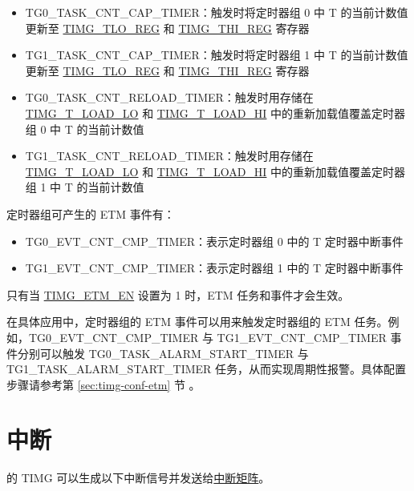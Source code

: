 \documentclass[main\_\_CN.tex]{subfiles}
\begin{document}
\begin{itemize}
\item TG0\_TASK\_CNT\_CAP\_TIMER：触发时将定时器组 0 中 T 的当前计数值更新至 \hyperref[regdesc:TIMGTXLOREG]{TIMG\_TLO\_REG} 和 \hyperref[regdesc:TIMGTXHIREG]{TIMG\_THI\_REG} 寄存器
\item TG1\_TASK\_CNT\_CAP\_TIMER：触发时将定时器组 1 中 T 的当前计数值更新至 \hyperref[regdesc:TIMGTXLOREG]{TIMG\_TLO\_REG} 和 \hyperref[regdesc:TIMGTXHIREG]{TIMG\_THI\_REG} 寄存器
\item TG0\_TASK\_CNT\_RELOAD\_TIMER：触发时用存储在 \hyperref[fielddesc:TIMGTXLOADLO]{TIMG\_T\_LOAD\_LO} 和 \hyperref[fielddesc:TIMGTXLOADHI]{TIMG\_T\_LOAD\_HI} 中的重新加载值覆盖定时器组 0 中 T 的当前计数值
\item TG1\_TASK\_CNT\_RELOAD\_TIMER：触发时用存储在 \hyperref[fielddesc:TIMGTXLOADLO]{TIMG\_T\_LOAD\_LO} 和 \hyperref[fielddesc:TIMGTXLOADHI]{TIMG\_T\_LOAD\_HI} 中的重新加载值覆盖定时器组 1 中 T 的当前计数值
\end{itemize}

定时器组可产生的 ETM 事件有：

\begin{itemize}
\item TG0\_EVT\_CNT\_CMP\_TIMER：表示定时器组 0 中的 T 定时器中断事件
\item TG1\_EVT\_CNT\_CMP\_TIMER：表示定时器组 1 中的 T 定时器中断事件
\end{itemize}

只有当 \hyperref[fielddesc:TIMGETMEN]{TIMG\_ETM\_EN} 设置为 1 时，ETM 任务和事件才会生效。

在具体应用中，定时器组的 ETM 事件可以用来触发定时器组的 ETM 任务。例如，TG0\_EVT\_CNT\_CMP\_TIMER 与 TG1\_EVT\_CNT\_CMP\_TIMER 事件分别可以触发 TG0\_TASK\_ALARM\_START\_TIMER 与 TG1\_TASK\_ALARM\_START\_TIMER 任务，从而实现周期性报警。具体配置步骤请参考第 \ref{sec:timg-conf-etm} 节 \textit{}。


\section{中断}
\label{sec:timg-interrupt}

\chipname{} 的 TIMG 可以生成以下中断信号并发送给\hyperref[mod:intmtrx]{中断矩阵}。
\end{document}
